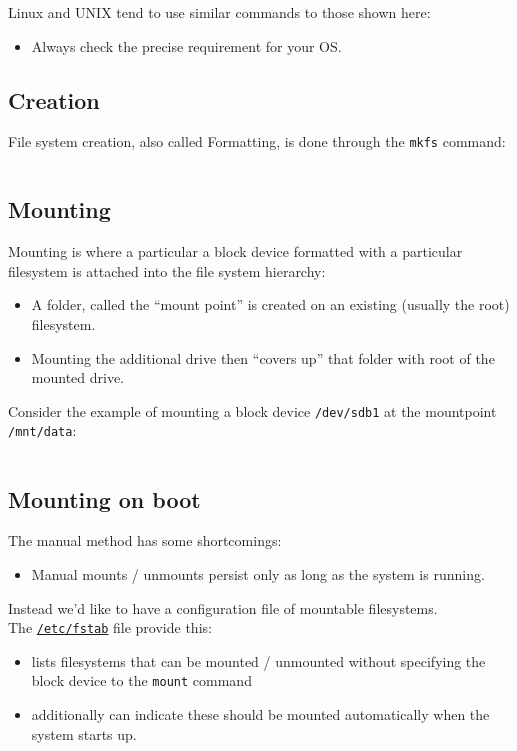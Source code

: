 \documentclass[slides]{pgnotes}
\begin{document}
Linux and UNIX tend to use similar commands to those shown here:
\begin{itemize}
\item Always check the precise requirement for your OS.
\end{itemize}
  
\subsection{Creation}
\label{sec:creation}

File system creation, also called Formatting, is done through the \texttt{mkfs} command:

\inputminted{bash}{fs_creation.sh}


\subsection{Mounting}\label{mounting}

Mounting is where a particular a block device formatted with a particular filesystem is attached into the file system hierarchy:
\begin{itemize}
\item A folder, called the ``mount point'' is created on an existing (usually the root) filesystem.
\item Mounting the additional drive then ``covers up'' that folder with root of the mounted drive.
\end{itemize}

\newpage
Consider the example of mounting a block device \texttt{/dev/sdb1} at
the mountpoint \texttt{/mnt/data}:

\inputminted{bash}{fs_mounting.sh}


\subsection{Mounting on boot}\label{mounting-on-boot}

The manual method has some shortcomings:
\begin{itemize}
\item Manual mounts / unmounts persist only as long as the system is running.
\end{itemize}
Instead we'd like to have a configuration file of mountable filesystems.\\
The \href{https://en.wikipedia.org/wiki/Fstab}{\texttt{/etc/fstab}} file provide this:
\begin{itemize}
\item lists filesystems that can be mounted / unmounted without specifying the block device to the \texttt{mount} command
\item additionally can indicate these should be mounted automatically when the system starts up.
\end{itemize}
\end{document}
